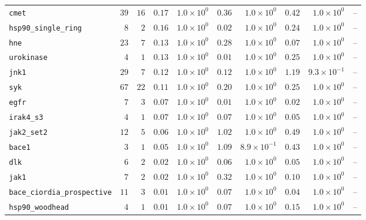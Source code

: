 \begin{table}[tp]
\begin{tabular}{@{}lrrrrrrrrc@{}}
\texttt{cmet} & $39$ & $16$ & $0.17$ & $1.0{\times}10^{0}$ & $0.36$ & $1.0{\times}10^{0}$ & $0.42$ & $1.0{\times}10^{0}$ & -- \\
\texttt{hsp90\_single\_ring} & $8$ & $2$ & $0.16$ & $1.0{\times}10^{0}$ & $0.02$ & $1.0{\times}10^{0}$ & $0.24$ & $1.0{\times}10^{0}$ & -- \\
\texttt{hne} & $23$ & $7$ & $0.13$ & $1.0{\times}10^{0}$ & $0.28$ & $1.0{\times}10^{0}$ & $0.07$ & $1.0{\times}10^{0}$ & -- \\
\texttt{urokinase} & $4$ & $1$ & $0.13$ & $1.0{\times}10^{0}$ & $0.01$ & $1.0{\times}10^{0}$ & $0.25$ & $1.0{\times}10^{0}$ & -- \\
\texttt{jnk1} & $29$ & $7$ & $0.12$ & $1.0{\times}10^{0}$ & $0.12$ & $1.0{\times}10^{0}$ & $1.19$ & $9.3{\times}10^{-1}$ & -- \\
\texttt{syk} & $67$ & $22$ & $0.11$ & $1.0{\times}10^{0}$ & $0.20$ & $1.0{\times}10^{0}$ & $0.25$ & $1.0{\times}10^{0}$ & -- \\
\texttt{egfr} & $7$ & $3$ & $0.07$ & $1.0{\times}10^{0}$ & $0.01$ & $1.0{\times}10^{0}$ & $0.02$ & $1.0{\times}10^{0}$ & -- \\
\texttt{irak4\_s3} & $4$ & $1$ & $0.07$ & $1.0{\times}10^{0}$ & $0.07$ & $1.0{\times}10^{0}$ & $0.05$ & $1.0{\times}10^{0}$ & -- \\
\texttt{jak2\_set2} & $12$ & $5$ & $0.06$ & $1.0{\times}10^{0}$ & $1.02$ & $1.0{\times}10^{0}$ & $0.49$ & $1.0{\times}10^{0}$ & -- \\
\texttt{bace1} & $3$ & $1$ & $0.05$ & $1.0{\times}10^{0}$ & $1.09$ & $8.9{\times}10^{-1}$ & $0.43$ & $1.0{\times}10^{0}$ & -- \\
\texttt{dlk} & $6$ & $2$ & $0.02$ & $1.0{\times}10^{0}$ & $0.06$ & $1.0{\times}10^{0}$ & $0.05$ & $1.0{\times}10^{0}$ & -- \\
\texttt{jak1} & $7$ & $2$ & $0.02$ & $1.0{\times}10^{0}$ & $0.32$ & $1.0{\times}10^{0}$ & $0.10$ & $1.0{\times}10^{0}$ & -- \\
\texttt{bace\_ciordia\_prospective} & $11$ & $3$ & $0.01$ & $1.0{\times}10^{0}$ & $0.07$ & $1.0{\times}10^{0}$ & $0.04$ & $1.0{\times}10^{0}$ & -- \\
\texttt{hsp90\_woodhead} & $4$ & $1$ & $0.01$ & $1.0{\times}10^{0}$ & $0.07$ & $1.0{\times}10^{0}$ & $0.15$ & $1.0{\times}10^{0}$ & -- \\
\bottomrule
\end{tabular}
\end{table}

